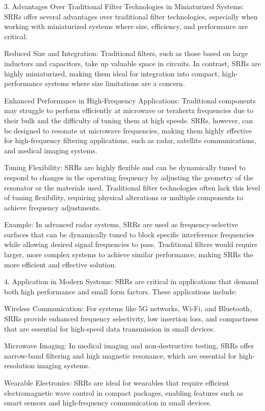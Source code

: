 \documentclass[conference]{IEEEtran}
\begin{document}
3. Advantages Over Traditional Filter Technologies in Miniaturized Systems: SRRs offer several advantages over traditional filter technologies, especially when working with miniaturized systems where size, efficiency, and performance are critical:

Reduced Size and Integration: Traditional filters, such as those based on large inductors and capacitors, take up valuable space in circuits. In contrast, SRRs are highly miniaturized, making them ideal for integration into compact, high-performance systems where size limitations are a concern.

Enhanced Performance in High-Frequency Applications: Traditional components may struggle to perform efficiently at microwave or terahertz frequencies due to their bulk and the difficulty of tuning them at high speeds. SRRs, however, can be designed to resonate at microwave frequencies, making them highly effective for high-frequency filtering applications, such as radar, satellite communications, and medical imaging systems.

Tuning Flexibility: SRRs are highly flexible and can be dynamically tuned to respond to changes in the operating frequency by adjusting the geometry of the resonator or the materials used. Traditional filter technologies often lack this level of tuning flexibility, requiring physical alterations or multiple components to achieve frequency adjustments.

Example: In advanced radar systems, SRRs are used as frequency-selective surfaces that can be dynamically tuned to block specific interference frequencies while allowing desired signal frequencies to pass. Traditional filters would require larger, more complex systems to achieve similar performance, making SRRs the more efficient and effective solution.

4. Application in Modern Systems: SRRs are critical in applications that demand both high performance and small form factors. These applications include:

Wireless Communication: For systems like 5G networks, Wi-Fi, and Bluetooth, SRRs provide enhanced frequency selectivity, low insertion loss, and compactness that are essential for high-speed data transmission in small devices.

Microwave Imaging: In medical imaging and non-destructive testing, SRRs offer narrow-band filtering and high magnetic resonance, which are essential for high-resolution imaging systems.

Wearable Electronics: SRRs are ideal for wearables that require efficient electromagnetic wave control in compact packages, enabling features such as smart sensors and high-frequency communication in small devices.
\end{document}
